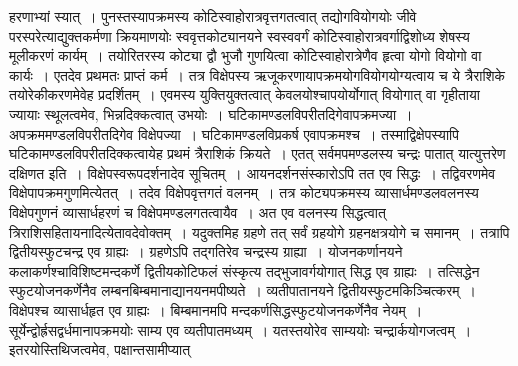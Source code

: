 \documentclass[11pt, openany]{book}
\begin{document}
\noindent हरणाभ्यां स्यात्~। पुनस्तस्यापक्रमस्य कोटिस्वाहोरात्रवृत्तगतत्वात् तद्योगवियोगयोः {\qt जीवे परस्परे}त्याद्युक्तकर्मणा क्रियमाणयोः स्ववृत्तकोट्यानयने स्वस्ववर्गं कोटिस्वाहोरात्रवर्गाद्विशोध्य शेषस्य मूलीकरणं कार्यम्~। तयोरितरस्य कोट्या द्वौ भुजौ गुणयित्वा कोटिस्वाहोरात्रेणैव हृत्वा योगो वियोगो वा कार्यः~। एतदेव प्रथमतः प्राप्तं कर्म~। तत्र विक्षेपस्य ऋजूकरणायापक्रमयोगवियोगयोग्यत्वाय च ये त्रैराशिके तयोरेकीकरणमेवेह प्रदर्शितम्~। एवमस्य युक्तियुक्तत्वात् केवलयोश्चापयोर्योगात् वियोगात् वा गृहीताया ज्यायाः स्थूलत्वमेव, भिन्नदिक्कत्वात् उभयोः~। घटिकामण्डलविपरीतदिगेवापक्रमज्या~। अपक्रममण्डलविपरीतदिगेव विक्षेपज्या~। घटिकामण्डलविप्रकर्ष एवापक्रमश्च~।
तस्माद्विक्षेपस्यापि घटिकामण्डलविपरीतदिक्कत्वायेह प्रथमं त्रैराशिकं क्रियते~। एतत् सर्वमपमण्डलस्य {\qt चन्द्रः पातात् यात्युत्तरेण दक्षिणत} इति~। विक्षेपस्वरूपदर्शनादेव सूचितम्~। आयनदर्शनसंस्कारोऽपि तत एव सिद्धः~। तद्विवरणमेव {\qt विक्षेपापक्रमगुण}मित्येतत्~। तदेव विक्षेपवृत्तगतं वलनम्~। तत्र कोट्यपक्रमस्य व्यासार्धमण्डलवलनस्य विक्षेपगुणनं व्यासार्धहरणं च विक्षेपमण्डलगतत्वायैव~। अत एव वलनस्य सिद्धत्वात् त्रिराशिसहितायनादित्येतावदेवोक्तम्~। यदुक्तमिह ग्रहणे तत् सर्वं ग्रहयोगे ग्रहनक्षत्रयोगे च समानम्~। तत्रापि द्वितीयस्फुटचन्द्र एव ग्राह्यः~। ग्रहणेऽपि तद्गतिरेव चन्द्रस्य ग्राह्या~। योजनकर्णानयने कलाकर्णश्चाविशिष्टमन्दकर्णे द्वितीयकोटिफलं संस्कृत्य तद्भुजावर्गयोगात् सिद्ध एव
ग्राह्यः~। तत्सिद्धेन स्फुटयोजनकर्णेनैव लम्बनबिम्बमानाद्यानयनमपीष्यते~। व्यतीपातानयने द्वितीयस्फुटमकिञ्चित्करम्~। विक्षेपश्च
व्यासार्धहृत एव ग्राह्यः~। बिम्बमानमपि मन्दकर्णसिद्धस्फुटयोजनकर्णेनैव नेयम्~। सूर्येन्द्वोर्ह्रसद्वर्धमानापक्रमयोः साम्य एव व्यतीपातमध्यम्~।
यतस्तयोरेव साम्ययोः चन्द्रार्कयोगजत्वम्~। इतरयोस्तिथिजत्वमेव, पक्षान्तसामीप्यात्
 
\newpage
\end{document}
